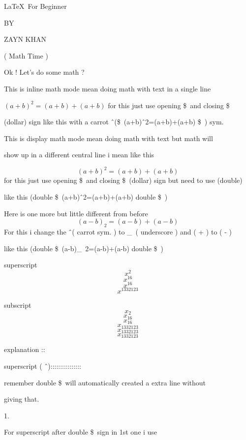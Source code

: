 \documentclass[11pt]{article}
\begin{document}
\begin{center}
\Large \LaTeX\ For Beginner

\small BY

\Large ZAYN KHAN

\vspace{1cm}

\large ( Math Time )
\end{center}



 Ok ! Let's do some math ?
 
This is inline math mode mean doing math with text in a single line 

${(a+b)^2=(a+b)+(a+b)}$ for this just use opening \$\ and closing \$\

(dollar) sign like this with a carrot \^\ (\$\ (a+b)\^\ 2=(a+b)+(a+b) \$\ ) sym.
 
 \vspace{1cm}
 
 This is display math mode mean doing math with text but math will 
 
 show up in a different central line i mean like this

$${(a+b)^2=(a+b)+(a+b)}$$ for this just use opening \$\ and closing \$\ (dollar) sign but need to use (double)

like this (double \$\ (a+b)\^\ 2=(a+b)+(a+b) double \$\ )

\vspace{1cm}

Here is one more but little different from before
 $$(a-b)_2=(a-b)+(a-b)$$
For this i change the \^\ ( carrot sym. ) to \_\ ( underscore ) and ( + ) to ( - )


like this (double \$\ (a-b)\_\ 2=(a-b)+(a-b) double \$\ )


 \pagebreak
 
 
 superscript
 $$x^2$$ $$x^16$$
 $$x^{16}$$
 $$x^{1332123}$$
 
 subscript
 $$x_2$$ $$x_16$$
 $$x_{16}$$
 $$x_{1{3{3{2{1{2{3}}}}}}}$$
 $$x_{1{3{3{2{1}}2}3}}$$
 $$x_{1332123}$$
 
 explanation ::
 
 superscript ( \^\ )::::::::::::::::
 
 remember double \$\ will automatically created a extra line without
 
 giving that.
 
1.
 
  For superscript after double \$\ sign in 1st one i use 
 
\end{document}
